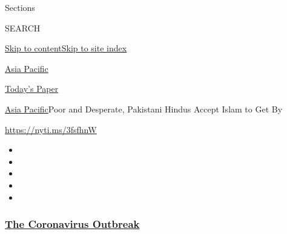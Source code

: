 Sections

SEARCH

\protect\hyperlink{site-content}{Skip to
content}\protect\hyperlink{site-index}{Skip to site index}

\href{https://www.nytimes3xbfgragh.onion/section/world/asia}{Asia
Pacific}

\href{https://myaccount.nytimes3xbfgragh.onion/auth/login?response_type=cookie\&client_id=vi}{}

\href{https://www.nytimes3xbfgragh.onion/section/todayspaper}{Today's
Paper}

\href{/section/world/asia}{Asia Pacific}\textbar{}Poor and Desperate,
Pakistani Hindus Accept Islam to Get By

\url{https://nyti.ms/3fsfhnW}

\begin{itemize}
\item
\item
\item
\item
\item
\end{itemize}

\hypertarget{the-coronavirus-outbreak}{%
\subsubsection{\texorpdfstring{\href{https://www.nytimes3xbfgragh.onion/news-event/coronavirus?name=styln-coronavirus-national\&region=TOP_BANNER\&block=storyline_menu_recirc\&action=click\&pgtype=Article\&impression_id=cfbfc660-f1e8-11ea-84e1-3d9340ced06b\&variant=undefined}{The
Coronavirus
Outbreak}}{The Coronavirus Outbreak}}\label{the-coronavirus-outbreak}}

